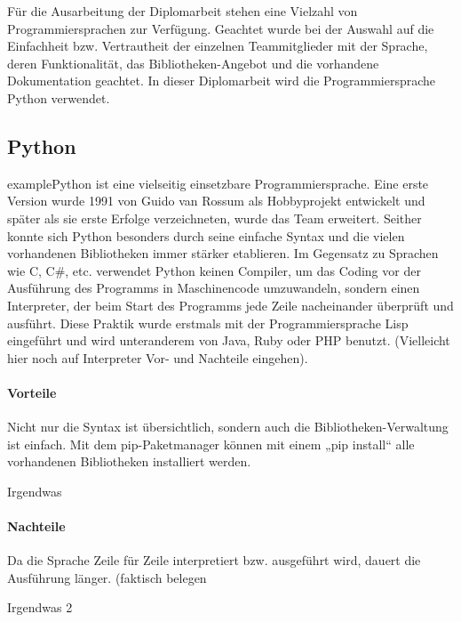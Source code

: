 Für die Ausarbeitung der Diplomarbeit stehen eine Vielzahl von Programmiersprachen zur Verfügung. Geachtet wurde bei der Auswahl auf die Einfachheit bzw. Vertrautheit der einzelnen Teammitglieder mit der Sprache, deren Funktionalität, das Bibliotheken-Angebot und die vorhandene Dokumentation geachtet. In dieser Diplomarbeit wird die Programmiersprache Python verwendet. 

\subsection{Python}
\gls{example}Python ist eine vielseitig einsetzbare Programmiersprache. Eine erste Version wurde 1991 von Guido van Rossum als Hobbyprojekt entwickelt und später als sie erste Erfolge verzeichneten, wurde das Team erweitert. Seither konnte sich Python besonders durch seine einfache Syntax und die vielen vorhandenen Bibliotheken immer stärker etablieren. Im Gegensatz zu Sprachen wie C, C\#, etc. verwendet Python keinen Compiler, um das Coding vor der Ausführung des Programms in Maschinencode umzuwandeln, sondern einen Interpreter, der beim Start des Programms jede Zeile nacheinander überprüft und ausführt. Diese Praktik wurde erstmals mit der Programmiersprache Lisp eingeführt und wird unteranderem von Java, Ruby oder PHP benutzt. (Vielleicht hier noch auf Interpreter Vor- und Nachteile eingehen). 

\paragraph{Vorteile}
\begin{list}{}{}
	\item Nicht nur die Syntax ist übersichtlich, sondern auch die Bibliotheken-Verwaltung ist einfach. Mit dem pip-Paketmanager können mit einem „pip install“ alle vorhandenen Bibliotheken installiert werden.
	\item Irgendwas
\end{list}


\paragraph{Nachteile}
\begin{list}{}{}
	\item Da die Sprache Zeile für Zeile interpretiert bzw. ausgeführt wird, dauert die Ausführung länger. (faktisch belegen
	\item Irgendwas 2
\end{list}

